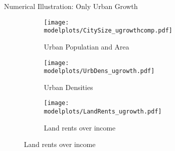 \documentclass[aspectratio=169]{beamer}
\begin{document}
\begin{frame}{Numerical Illustration: Only Urban Growth}
	\begin{figure}
		
		\begin{subfigure}[t]{0.32\textwidth}
			\begin{centering}
				\texttt{[image: \\modelplots/CitySize\_ugrowthcomp.pdf]}
				\caption{Urban Populatian and Area}
			\end{centering}
		\end{subfigure}
		\hfill
		\begin{subfigure}[t]{0.32\textwidth}
			\begin{centering}
				\texttt{[image: \\modelplots/UrbDens\_ugrowth.pdf]}			
				\caption{Urban Densities}
			\end{centering}
		\end{subfigure}
		\hfill
		\begin{subfigure}[t]{0.32\textwidth}
			\begin{centering}
				\texttt{[image: \\modelplots/LandRents\_ugrowth.pdf]}
				\caption{Land rents over income}
			\end{centering}
		\end{subfigure}
	\end{figure}
	\end{frame}
\end{document}
